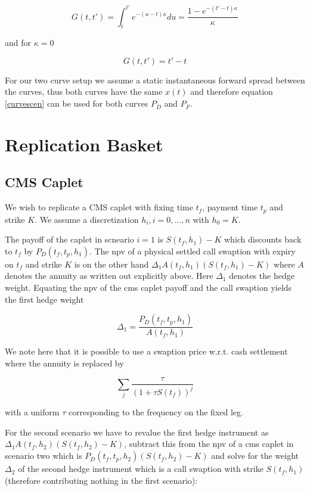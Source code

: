 \documentclass{amsart}
\theoremstyle{plain}
\numberwithin{equation}{section}
\begin{document}
\begin{equation}
G(t,t') = \int_t^{t'} e^{-(u-t)\kappa} du = \frac{1-e^{-(t'-t)\kappa}}{\kappa}
\end{equation}

and for $\kappa=0$

\begin{equation}
G(t,t') = t' - t
\end{equation}

For our two curve setup we assume a static instantaneous forward spread between the curves, thus both curves have the same $x(t)$ and therefore equation \ref{curvescen} can be used for both curves $P_D$ and $P_F$. 

\section{Replication Basket}

\subsection{CMS Caplet}

We wish to replicate a CMS caplet with fixing time $t_f$, payment time $t_p$ and strike $K$. We assume a discretization $h_i, i=0,...,n$ with $h_0=K$.

The payoff of the caplet in scneario $i=1$ is $S(t_f,h_1)-K$ which discounts back to $t_f$ by $P_D(t_f,t_p,h_1)$. The npv of a physical settled call swaption with expiry on $t_f$ and strike $K$ is on the other hand $\Delta_1A(t_f,h_1)(S(t_f,h_1)-K)$ where $A$ denotes the annuity as written out explicitly above. Here $\Delta_1$ denotes the hedge weight. Equating the npv of the cms caplet payoff and the call swaption yields the first hedge weight

\begin{equation}
\Delta_1 = \frac{P_D(t_f,t_p,h_1)}{A(t_f,h_1)}
\end{equation}

We note here that it is possible to use a swaption price w.r.t. cash settlement where the annuity is replaced by

\begin{equation}
\sum_j \frac{\tau}{(1+\tau S(t_f))^ j}
\end{equation}

with a uniform $\tau$ corresponding to the frequency on the fixed leg.

For the second scenario we have to revalue the first hedge instrument as $\Delta_1A(t_f,h_2)(S(t_f,h_2)-K)$, subtract this from the npv of a cms caplet in scenario two which is $P_D(t_f,t_p,h_2)(S(t_f,h_2)-K)$ and solve for the weight $\Delta_2$ of the second hedge instrument which is a call swaption with strike $S(t_f,h_1)$ (therefore contributing nothing in the first scenario):
\end{document}
